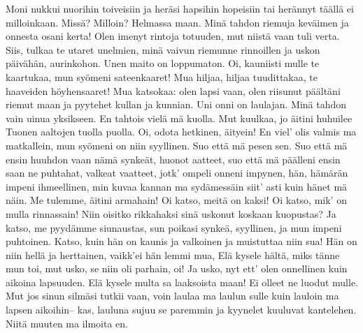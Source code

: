     Moni nukkui nuorihin toiveisiin
    ja heräsi hapsihin hopeisiin
    tai herännyt täällä ei milloinkaan.
    Missä? Milloin? Helmassa maan.
    Minä tahdon riemuja keväimen
    ja onnesta osani kerta!
    Olen imenyt rintoja totuuden,
    mut niistä vaan tuli verta.
    Siis, tulkaa te utaret unelmien,
    minä vaivun riemunne rinnoillen
    ja uskon päivähän, aurinkohon.
    Unen maito on loppumaton.
  \endverse
  \beginverse
    Oi, kauniisti mulle te kaartukaa,
    mun syömeni sateenkaaret!
    Mua hiljaa, hiljaa tuudittakaa,
    te haaveiden höyhensaaret!
    Mua katsokaa: olen lapsi vaan,
    olen riisunut päältäni riemut maan
    ja pyytehet kullan ja kunnian.
    Uni onni on laulajan.
  \endverse
  \beginverse
    Minä tahdon vain uinua yksikseen.
    En tahtois vielä mä kuolla.
    Mut kuulkaa, jo äitini huhuilee
    Tuonen aaltojen tuolla puolla.
    Oi, odota hetkinen, äityein!
    En viel' olis valmis ma matkallein,
    mun syömeni on niin syyllinen.
    Suo että mä pesen sen.
  \endverse
  \beginverse
    Suo että mä ensin huuhdon vaan
    nämä synkeät, huonot aatteet,
    suo että mä päälleni ensin saan
    ne puhtahat, valkeat vaatteet,
    jotk' ompeli onneni impynen,
    hän, hämärän impeni ihmeellinen,
    min kuvaa kannan ma sydämessäin
    siit' asti kuin hänet mä näin.
  \endverse
  \beginverse
    Me tulemme, äitini armahain!
    Oi katso, meitä on kaksi!
    Oi katso, mik' on mulla rinnassain!
    Niin oisitko rikkahaksi
    sinä uskonut koskaan kuopustas?
    Ja katso, me pyydämme siunaustas,
    sun poikasi synkeä, syyllinen,
    ja mun impeni puhtoinen.
  \endverse
  \beginverse
    Katso, kuin hän on kaunis ja valkoinen
    ja muistuttaa niin sua!
    Hän on niin hellä ja herttainen,
    vaikk'ei hän lemmi mua,
    Elä kysele hältä, miks tänne mun toi,
    mut usko, se niin oli parhain, oi!
    Ja usko, nyt ett' olen onnellinen
    kuin aikoina lapsuuden.
  \endverse
  \beginverse
    Elä kysele multa sa laaksoista maan!
    Ei olleet ne luodut mulle.
    Mut jos sinun silmäsi tutkii vaan,
    voin laulaa ma laulun sulle
    kuin lauloin ma lapsen aikoihin--
    kas, lauluna sujuu se paremmin
    ja kyynelet kuuluvat kantelehen.
    Niitä muuten ma ilmoita en.
  \endverse
\endsong


